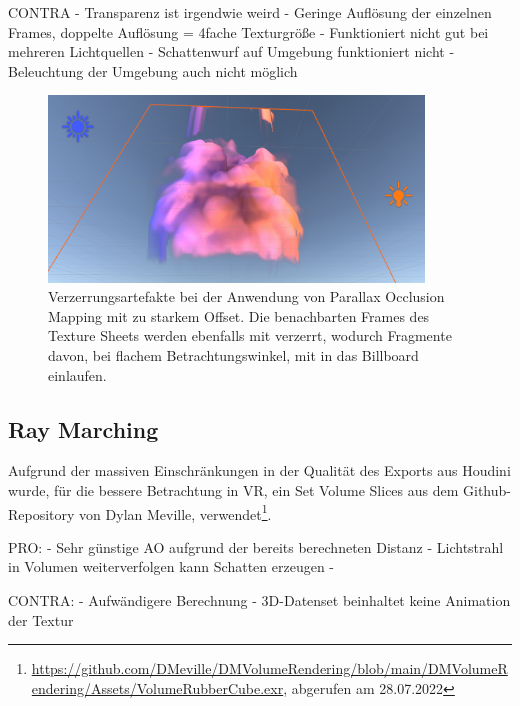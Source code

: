 CONTRA\newline
- Transparenz ist irgendwie weird\newline
- Geringe Auflösung der einzelnen Frames, doppelte Auflösung = 4fache Texturgröße \newline
- Funktioniert nicht gut bei mehreren Lichtquellen\newline
- Schattenwurf auf Umgebung funktioniert nicht\newline
- Beleuchtung der  Umgebung auch nicht möglich\newline

\begin{figure}[h!]
	\includegraphics[width=0.89\textwidth]{Grafiken/Evaluation/Smoke_artefacts.png}
	\centering
	\begin{footnotesize}
		\caption{Verzerrungsartefakte bei der Anwendung von Parallax Occlusion Mapping mit zu starkem Offset. Die benachbarten Frames des Texture Sheets
			werden ebenfalls mit verzerrt, wodurch Fragmente davon, bei flachem Betrachtungswinkel, mit in das Billboard einlaufen.}
		\label{fig:smokeBleeding}
	\end{footnotesize}
\end{figure}



\subsection{Ray Marching}
\label{sec:5.2}

Aufgrund der massiven Einschränkungen in der Qualität des Exports aus Houdini wurde, für die bessere Betrachtung in VR, ein Set Volume Slices aus dem Github-Repository von Dylan Meville, 
verwendet\footnote{\url{https://github.com/DMeville/DMVolumeRendering/blob/main/DMVolumeRendering/Assets/VolumeRubberCube.exr}, abgerufen am 28.07.2022}.



PRO: \newline
- Sehr günstige AO aufgrund der bereits berechneten Distanz\newline
- Lichtstrahl in Volumen weiterverfolgen kann Schatten erzeugen\newline
-

CONTRA: \newline
- Aufwändigere Berechnung\newline
- 3D-Datenset beinhaltet keine Animation der Textur\newline




